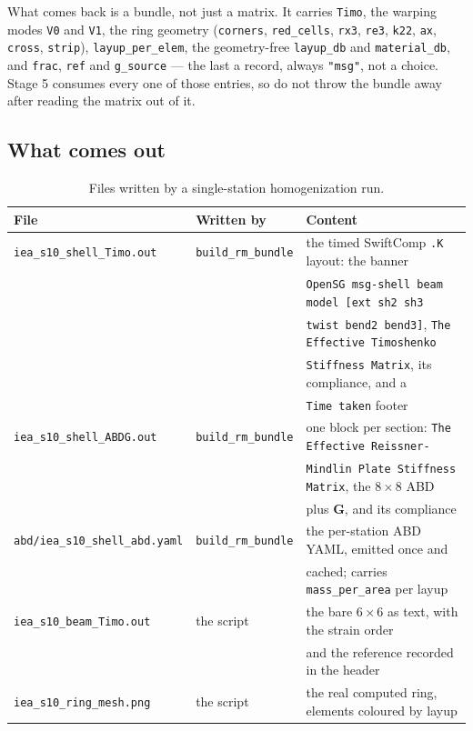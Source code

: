 What comes back is a bundle, not just a matrix. It carries \texttt{Timo}, the
warping modes \texttt{V0} and \texttt{V1}, the ring geometry
(\texttt{corners}, \texttt{red\_cells}, \texttt{rx3}, \texttt{re3},
\texttt{k22}, \texttt{ax}, \texttt{cross}, \texttt{strip}),
\texttt{layup\_per\_elem}, the geometry-free \texttt{layup\_db} and
\texttt{material\_db}, and \texttt{frac}, \texttt{ref} and \texttt{g\_source}
--- the last a record, always \texttt{"msg"}, not a choice.
Stage 5 consumes every one of those entries, so do not throw the bundle away
after reading the matrix out of it.

\subsection*{What comes out}

\begin{table}[htbp]
\centering
\small
\caption{Files written by a single-station homogenization run.}
\label{tab:windio:stage2out}
\setlength{\tabcolsep}{4pt}
\begin{tabular}{lll}
\toprule
File & Written by & Content \\
\midrule
\texttt{iea\_s10\_shell\_Timo.out} & \texttt{build\_rm\_bundle} & the timed SwiftComp \texttt{.K} layout: the banner \\
  &  & \texttt{OpenSG msg-shell beam model [ext sh2 sh3} \\
  &  & \texttt{twist bend2 bend3]}, \texttt{The Effective Timoshenko} \\
  &  & \texttt{Stiffness Matrix}, its compliance, and a \\
  &  & \texttt{Time taken} footer \\
\texttt{iea\_s10\_shell\_ABDG.out} & \texttt{build\_rm\_bundle} & one block per section: \texttt{The Effective Reissner-} \\
  &  & \texttt{Mindlin Plate Stiffness Matrix}, the $8\times8$ ABD \\
  &  & plus $\mathbf{G}$, and its compliance \\
\texttt{abd/iea\_s10\_shell\_abd.yaml} & \texttt{build\_rm\_bundle} & the per-station ABD YAML, emitted once and \\
  &  & cached; carries \texttt{mass\_per\_area} per layup \\
\texttt{iea\_s10\_beam\_Timo.out} & the script & the bare $6\times6$ as text, with the strain order \\
  &  & and the reference recorded in the header \\
\texttt{iea\_s10\_ring\_mesh.png} & the script & the real computed ring, elements coloured by layup \\
\bottomrule
\end{tabular}
\end{table}

